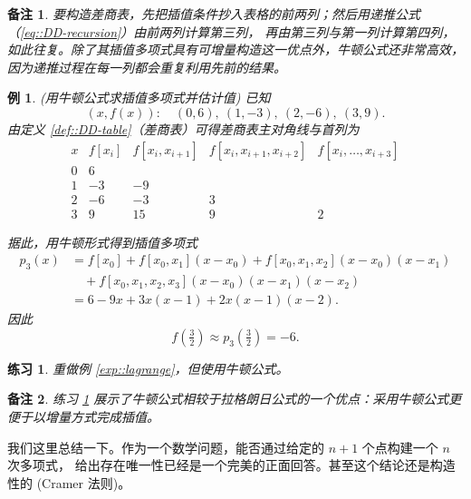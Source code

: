 \documentclass[a4paper]{ctexart}
\newtheorem{remark}{备注}
\newtheorem{example}[theorem]{例}
\newtheorem{exercise}[theorem]{练习}
\numberwithin{theorem}{section}
\numberwithin{equation}{section}
\numberwithin{figure}{section}
\numberwithin{remark}{section}
\begin{document}
\begin{remark}
要构造差商表，先把插值条件抄入表格的前两列；然后用递推公式（\ref{eq::DD-recursion}）由前两列计算第三列，
再由第三列与第一列计算第四列，如此往复。除了其插值多项式具有可增量构造这一优点外，牛顿公式还非常高效，因为递推过程在每一列都会重复利用先前的结果。    
\end{remark}


\begin{example}(用牛顿公式求插值多项式并估计值)
    \label{exp::newton_interpolation}
已知
\[
(x,f(x)):\quad (0,6),\ (1,-3),\ (2,-6),\ (3,9).
\]
由定义 \ref{def::DD-table}（差商表）可得差商表主对角线与首列为
\begin{equation}
\begin{array}{c|cccc}
x & f[x_i] & f[x_i,x_{i+1}] & f[x_i,x_{i+1},x_{i+2}] & f[x_i,\ldots,x_{i+3}]\\ \hline
0 & 6\\
1 & -3 & -9\\
2 & -6 & -3 & 3\\
3 & 9 & 15 & 9 & 2
\end{array}
\end{equation}

据此，用牛顿形式得到插值多项式
\begin{equation}
    \label{eq::newton_example}
\begin{aligned}
p_3(x)
&=f[x_0]+f[x_0,x_1](x-x_0)+f[x_0,x_1,x_2](x-x_0)(x-x_1)\\
&\quad +f[x_0,x_1,x_2,x_3](x-x_0)(x-x_1)(x-x_2)\\
&=6-9x+3x(x-1)+2x(x-1)(x-2).
\end{aligned}
\end{equation}
因此
\[
f\!\left(\tfrac{3}{2}\right)\approx p_3\!\left(\tfrac{3}{2}\right)=-6.
\]
\end{example}

\begin{exercise}
    \label{exe::newton_interpolation}
重做例 \ref{exp::lagrange}，但使用牛顿公式。
\end{exercise}

\begin{remark}
练习 \ref{exe::newton_interpolation} 展示了牛顿公式相较于拉格朗日公式的一个优点：采用牛顿公式更便于以增量方式完成插值。
\end{remark}
我们这里总结一下。作为一个数学问题，能否通过给定的 $n + 1$ 个点构建一个 $n$ 次多项式，
给出存在唯一性已经是一个完美的正面回答。甚至这个结论还是构造性的 (Cramer 法则)。
\end{document}
